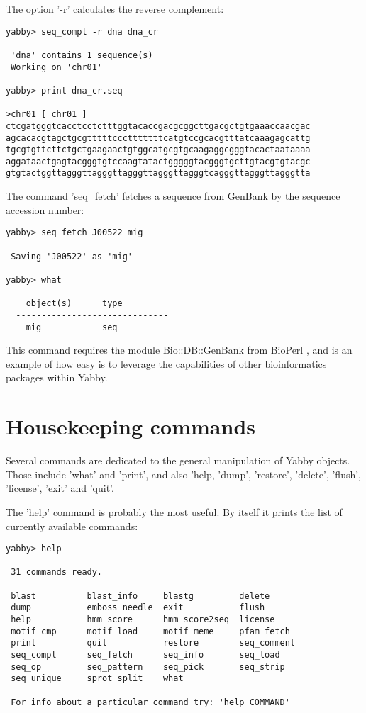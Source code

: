 The option '-r' calculates the reverse complement: 

\begin{verbatim}
yabby> seq_compl -r dna dna_cr

 'dna' contains 1 sequence(s)
 Working on 'chr01'

yabby> print dna_cr.seq

>chr01 [ chr01 ]
ctcgatgggtcacctcctctttggtacaccgacgcggcttgacgctgtgaaaccaacgac
agcacacgtagctgcgtttttccctttttttcatgtccgcacgtttatcaaagagcattg
tgcgtgttcttctgctgaagaactgtggcatgcgtgcaagaggcgggtacactaataaaa
aggataactgagtacgggtgtccaagtatactgggggtacgggtgcttgtacgtgtacgc
gtgtactggttagggttagggttagggttagggttagggtcagggttagggttagggtta
\end{verbatim}


The command 'seq\_fetch' fetches a sequence from GenBank
by the sequence accession number:

\begin{verbatim}
yabby> seq_fetch J00522 mig

 Saving 'J00522' as 'mig'

yabby> what

    object(s)      type
  ------------------------------
    mig            seq           
\end{verbatim}

This command requires the module Bio::DB::GenBank from
BioPerl \cite{bioperl}, and is an example of how easy is
to leverage the capabilities of other bioinformatics packages
within Yabby.

\section{Housekeeping commands}


Several commands are dedicated to the general manipulation of
Yabby objects. Those include 'what' and 'print', and also
'help, 'dump', 'restore', 'delete', 'flush', 'license', 'exit'
and 'quit'.

The 'help' command is probably the most useful. By itself it
prints the list of currently available commands: 

\begin{verbatim}
yabby> help

 31 commands ready.

 blast          blast_info     blastg         delete        
 dump           emboss_needle  exit           flush         
 help           hmm_score      hmm_score2seq  license       
 motif_cmp      motif_load     motif_meme     pfam_fetch    
 print          quit           restore        seq_comment   
 seq_compl      seq_fetch      seq_info       seq_load      
 seq_op         seq_pattern    seq_pick       seq_strip     
 seq_unique     sprot_split    what          

 For info about a particular command try: 'help COMMAND'
\end{verbatim}

